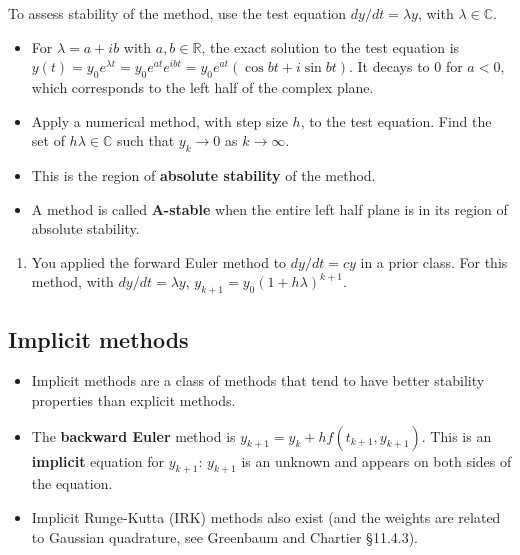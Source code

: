 \documentclass[12pt,letterpaper,noanswers]{exam}
\begin{document}
\begin{tcolorbox}
To assess stability of the method, use the test equation $dy/dt = \lambda y$, with $\lambda \in \mathbb{C}$.
\begin{itemize}
\itemsep0pt
\item For $\lambda = a + ib$ with $a,b\in\mathbb{R}$, the exact solution to the test equation is $y(t) = y_0e^{\lambda t} = y_0e^{at}e^{ibt} = y_0e^{at}(\cos bt + i \sin bt)$.  It decays to $0$ for $a<0$, which corresponds to the left half of the complex plane.
    \item Apply a numerical method, with step size $h$, to the test equation.  Find the set of $h\lambda \in \mathbb{C}$ such that $y_k\rightarrow 0$ as $k\rightarrow\infty$.
    \item This is the region of \textbf{absolute stability} of the method.
    \item A method is called \textbf{A-stable} when the entire left half plane is in its region of absolute stability.
\end{itemize}
\end{tcolorbox}
\begin{enumerate}[resume]
    \item You applied the forward Euler method to $dy/dt = cy$ in a prior class.  For this method, with $dy/dt = \lambda y$, $y_{k+1} = y_0(1+h\lambda)^{k+1}$.  
\end{enumerate}




\subsection*{Implicit methods}
\begin{tcolorbox}
\begin{itemize}
\itemsep0pt
    \item Implicit methods are a class of methods that tend to have better stability properties than explicit methods.
    \item The \textbf{backward Euler} method is $y_{k+1} = y_k + hf(t_{k+1},y_{k+1})$.  This is an \textbf{implicit} equation for $y_{k+1}$: $y_{k+1}$ is an unknown and appears on both sides of the equation.
    \item Implicit Runge-Kutta (IRK) methods also exist (and the weights are related to Gaussian quadrature, see Greenbaum and Chartier \S 11.4.3).
\end{itemize}
\end{tcolorbox}
\end{document}
